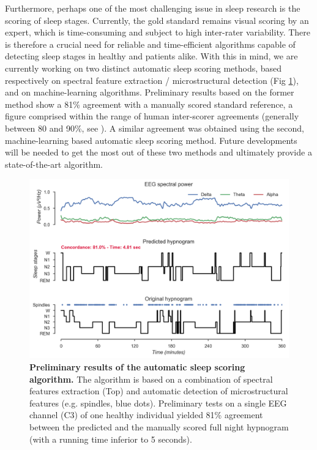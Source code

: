 Furthermore, perhaps one of the most challenging issue in sleep research is the scoring of sleep stages. Currently, the gold standard remains visual scoring by an expert, which is time-consuming and subject to high inter-rater variability. There is therefore a crucial need for reliable and time-efficient algorithms capable of detecting sleep stages in healthy and patients alike. With this in mind, we are currently working on two distinct automatic sleep scoring methods, based respectively on spectral feature extraction / microstructural detection (Fig \ref{fig:disc:methods:future:autoscore}), and on machine-learning algorithms. Preliminary results based on the former method show a 81\% agreement with a manually scored standard reference, a figure comprised within the range of human inter-scorer agreements (generally between 80 and 90\%, see \citealp{silber_visual_2007}). A similar agreement was obtained using the second, machine-learning based automatic sleep scoring method. Future developments will be needed to get the most out of these two methods and ultimately provide a state-of-the-art algorithm.

\begin{figure}[htb]
	\includegraphics[width=\textwidth]{Fig/Discussion/autoscore.png}
	\caption[Preliminary results of the automatic sleep scoring algorithm]{\textbf{Preliminary results of the automatic sleep scoring algorithm.} The algorithm is based on a combination of spectral features extraction (Top) and automatic detection of microstructural features (e.g. spindles, blue dots). Preliminary tests on a single EEG channel (C3) of one healthy individual yielded 81\% agreement between the predicted and the manually scored full night hypnogram (with a running time inferior to 5 seconds).}
	\label{fig:disc:methods:future:autoscore}
\end{figure}

